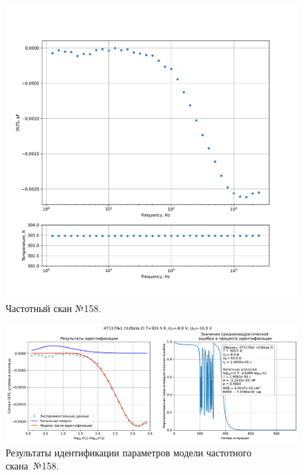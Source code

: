 \begin{figure}[!ht]
    \centering
    \includegraphics[width=1\textwidth]{../plots/КТ117№1_п1(база 2)_2500Гц-1Гц_1пФ_+30С_-8В-10В_50мВ_20мкс_шаг_0,1.pdf}
    \caption{Частотный скан №158.}
    \label{pic:frequency_scan_158}
\end{figure}

\begin{figure}[!ht]
    \centering
    \includegraphics[width=1\textwidth]{../plots/КТ117№1_п1(база 2)_2500Гц-1Гц_1пФ_+30С_-8В-10В_50мВ_20мкс_шаг_0,1_model.pdf}
    \caption{Результаты идентификации параметров модели частотного скана~№158.}
    \label{pic:frequency_scan_model158}
\end{figure}

\pagebreak


